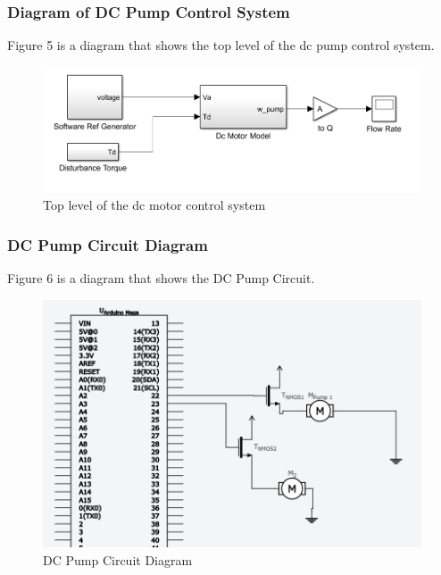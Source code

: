 \documentclass [10pt]{article}
\begin{document}
\pagebreak



\subsubsection{Diagram of DC Pump Control System}
Figure 5 is a diagram that shows the top level of the dc pump control system. 
\begin{figure} [h!]
	\centering
	\includegraphics [scale = 0.6] {Figures/DC_PumpSim.png}
	\caption{Top level of the dc motor control system}
\end{figure}



\subsubsection{DC Pump Circuit Diagram}
Figure 6 is a diagram that shows the DC Pump Circuit.
\begin{figure} [h!]
	\centering
	\includegraphics [scale = 0.6] {Figures/Pump.png}
	\caption{DC Pump Circuit Diagram}
\end{figure}
\end{document}
